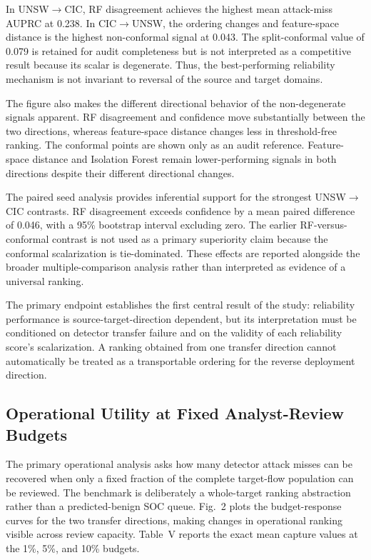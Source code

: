 \documentclass[conference]{IEEEtran}
\begin{document}
In UNSW$\rightarrow$CIC, RF disagreement achieves the highest mean attack-miss AUPRC at 0.238. In CIC$\rightarrow$UNSW, the ordering changes and feature-space distance is the highest non-conformal signal at 0.043. The split-conformal value of 0.079 is retained for audit completeness but is not interpreted as a competitive result because its scalar is degenerate. Thus, the best-performing reliability mechanism is not invariant to reversal of the source and target domains.

The figure also makes the different directional behavior of the non-degenerate signals apparent. RF disagreement and confidence move substantially between the two directions, whereas feature-space distance changes less in threshold-free ranking. The conformal points are shown only as an audit reference. Feature-space distance and Isolation Forest remain lower-performing signals in both directions despite their different directional changes.

The paired seed analysis provides inferential support for the strongest UNSW$\rightarrow$CIC contrasts. RF disagreement exceeds confidence by a mean paired difference of 0.046, with a 95\% bootstrap interval excluding zero. The earlier RF-versus-conformal contrast is not used as a primary superiority claim because the conformal scalarization is tie-dominated. These effects are reported alongside the broader multiple-comparison analysis rather than interpreted as evidence of a universal ranking.

The primary endpoint establishes the first central result of the study: reliability performance is source-target-direction dependent, but its interpretation must be conditioned on detector transfer failure and on the validity of each reliability score's scalarization. A ranking obtained from one transfer direction cannot automatically be treated as a transportable ordering for the reverse deployment direction.

\subsection{Operational Utility at Fixed Analyst-Review Budgets}

The primary operational analysis asks how many detector attack misses can be recovered when only a fixed fraction of the complete target-flow population can be reviewed. The benchmark is deliberately a whole-target ranking abstraction rather than a predicted-benign SOC queue. Fig.~2 plots the budget-response curves for the two transfer directions, making changes in operational ranking visible across review capacity. Table~V reports the exact mean capture values at the 1\%, 5\%, and 10\% budgets.
\end{document}
